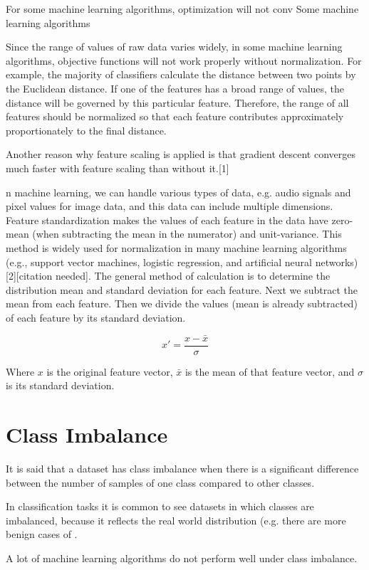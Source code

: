 For some machine learning algorithms, optimization will not conv
Some machine learning algorithms


Since the range of values of raw data varies widely, in some machine learning algorithms, objective functions will not work properly without normalization. For example, the majority of classifiers calculate the distance between two points by the Euclidean distance. If one of the features has a broad range of values, the distance will be governed by this particular feature. Therefore, the range of all features should be normalized so that each feature contributes approximately proportionately to the final distance.

Another reason why feature scaling is applied is that gradient descent converges much faster with feature scaling than without it.[1]

n machine learning, we can handle various types of data, e.g. audio signals and pixel values for image data, and this data can include multiple dimensions. Feature standardization makes the values of each feature in the data have zero-mean (when subtracting the mean in the numerator) and unit-variance. This method is widely used for normalization in many machine learning algorithms (e.g., support vector machines, logistic regression, and artificial neural networks)[2][citation needed]. The general method of calculation is to determine the distribution mean and standard deviation for each feature. Next we subtract the mean from each feature. Then we divide the values (mean is already subtracted) of each feature by its standard deviation.

$$
x' = \frac{x - \bar{x}}{\sigma}
$$

Where $x$ is the original feature vector, $\bar{x}$ is the mean of that feature vector, and $\sigma$ is its standard deviation.

\section{Class Imbalance}
\label{subsection:classimbalance}

It is said that a dataset has class imbalance when there is a significant difference between the number of samples of one class compared to other classes.

In classification tasks it is common to see datasets in which classes are imbalanced, because it reflects the real world distribution (e.g. there are more benign cases of .

A lot of machine learning algorithms do not perform well under class imbalance.

